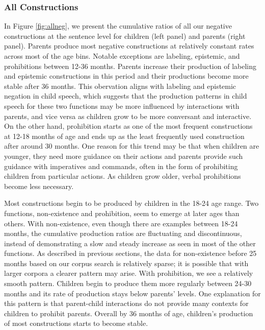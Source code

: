 \documentclass[
  man,floatsintext]{apa6}
\begin{document}
\subsubsection{All Constructions}\label{all-constructions}

In Figure \ref{fig:allneg}, we present the cumulative ratios of all our negative constructions at the sentence level for children (left panel) and parents (right panel). Parents produce most negative constructions at relatively constant rates across most of the age bins. Notable exceptions are labeling, epistemic, and prohibitions between 12-36 months. Parents increase their production of labeling and epistemic constructions in this period and their productions become more stable after 36 months. This obervation aligns with labeling and epistemic negation in child speech, which suggests that the production patterns in child speech for these two functions may be more influenced by interactions with parents, and vice versa as children grow to be more conversant and interactive. On the other hand, prohibition starts as one of the most frequent constructions at 12-18 months of age and ends up as the least frequently used construction after around 30 months. One reason for this trend may be that when children are younger, they need more guidance on their actions and parents provide such guidance with imperatives and commands, often in the form of prohibiting children from particular actions. As children grow older, verbal prohibitions become less necessary.

Most constructions begin to be produced by children in the 18-24 age range. Two functions, non-existence and prohibition, seem to emerge at later ages than others. With non-existence, even though there are examples between 18-24 months, the cumulative production ratios are fluctuating and discontinuous, instead of demonstrating a slow and steady increase as seen in most of the other functions. As described in previous sections, the data for non-existence before 25 months based on our corpus search is relatively sparse; it is possible that with larger corpora a clearer pattern may arise. With prohibition, we see a relatively smooth pattern. Children begin to produce them more regularly between 24-30 months and its rate of production stays below parents' levels. One explanation for this pattern is that parent-child interactions do not provide many contexts for children to prohibit parents. Overall by 36 months of age, children's production of most constructions starts to become stable.
\end{document}
